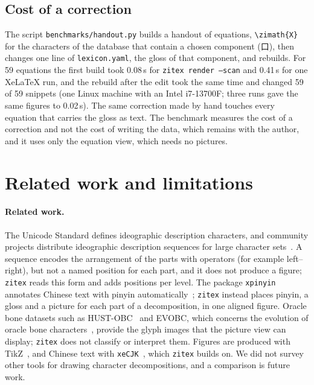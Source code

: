\documentclass[11pt]{article}
\newcommand{\cmd}[1]{\texttt{\textbackslash #1}}
\begin{document}
\subsection{Cost of a correction}
The script \texttt{benchmarks/handout.py} builds a handout of equations, \cmd{zimath}\texttt{\{X\}} for the characters of the database that
contain a chosen component (口), then changes one line of \texttt{lexicon.yaml}, the gloss of that component, and rebuilds. For 59 equations the
first build took 0.08\,s for \texttt{zitex render --scan} and 0.41\,s for one XeLaTeX run, and the rebuild after the edit took the same time and
changed 59 of 59 snippets (one Linux machine with an Intel i7-13700F; three runs gave the same figures to 0.02\,s). The same correction made by hand touches
every equation that carries the gloss as text. The benchmark measures the cost of a correction and not the cost of writing the data, which remains with the
author, and it uses only the equation view, which needs no pictures.

\section{Related work and limitations}\label{sec:limits}
\paragraph{Related work.} The Unicode Standard defines ideographic description characters, and community projects distribute ideographic description
sequences for large character sets~\cite{cjkviids}. A sequence encodes the arrangement of the parts with operators (for example left--right), but not
a named position for each part, and it does not produce a figure; \texttt{zitex} reads this form and adds positions per level. The package
\texttt{xpinyin} annotates Chinese text with pinyin automatically~\cite{xpinyin}; \texttt{zitex} instead places pinyin, a gloss and a picture for each
part of a decomposition, in one aligned figure. Oracle bone datasets such as HUST-OBC~\cite{hustobc} and EVOBC, which concerns the evolution of oracle bone
characters~\cite{evobc}, provide the glyph images that the picture view can display; \texttt{zitex} does not classify or interpret them. Figures are
produced with TikZ~\cite{tikz}, and Chinese text with \texttt{xeCJK}~\cite{xecjk}, which \texttt{zitex} builds on. We did not survey other tools for
drawing character decompositions, and a comparison is future work.
\end{document}
